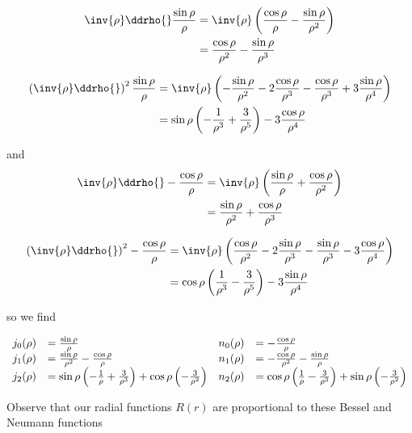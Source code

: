\begin{align*}
\inv{\rho} \ddrho{} \frac{\sin\rho}{\rho}
&= \inv{\rho} \left(
\frac{\cos\rho}{\rho}
-\frac{\sin\rho}{\rho^2}
\right) \\
&=
\frac{\cos\rho}{\rho^2}
-\frac{\sin\rho}{\rho^3}
\end{align*}

\begin{align*}
\left( \inv{\rho} \ddrho{} \right)^2 \frac{\sin\rho}{\rho}
&= \inv{\rho} \left(
-\frac{\sin\rho}{\rho^2}
-2\frac{\cos\rho}{\rho^3}
-\frac{\cos\rho}{\rho^3}
+3\frac{\sin\rho}{\rho^4}
\right) \\
&=
\sin\rho\left(
-\frac{1}{\rho^3}
+\frac{3}{\rho^5}
\right)
-3\frac{\cos\rho}{\rho^4}
\end{align*}

and
\begin{align*}
\inv{\rho} \ddrho{} -\frac{\cos\rho}{\rho}
&= \inv{\rho} \left(
\frac{\sin\rho}{\rho}
+\frac{\cos\rho}{\rho^2}
\right) \\
&=
\frac{\sin\rho}{\rho^2}
+\frac{\cos\rho}{\rho^3}
\end{align*}

\begin{align*}
\left( \inv{\rho} \ddrho{} \right)^2 -\frac{\cos\rho}{\rho}
&= \inv{\rho} \left(
\frac{\cos\rho}{\rho^2}
-2\frac{\sin\rho}{\rho^3}
-\frac{\sin\rho}{\rho^3}
-3\frac{\cos\rho}{\rho^4}
\right) \\
&=
\cos\rho\left(
\frac{1}{\rho^3}
-\frac{3}{\rho^5}
\right)
-3\frac{\sin\rho}{\rho^4}
\end{align*}

so we find

\begin{equation}\label{eqn:qmTwoL23:340}
\begin{array}{l l l l}
j_0(\rho) &= \frac{\sin\rho}{\rho} 					& n_0(\rho) &= -\frac{\cos\rho}{\rho} 	\\
j_1(\rho) &= \frac{\sin\rho}{\rho^2} -\frac{\cos\rho}{\rho} 		& n_1(\rho) &= -\frac{\cos\rho}{\rho^2} -\frac{\sin\rho}{\rho} \\
j_2(\rho) &= \sin\rho \left(-\frac{1}{\rho} + \frac{3}{\rho^3} \right) +\cos\rho \left(-\frac{3}{\rho^2} \right)
& n_2(\rho) &= \cos\rho \left(\frac{1}{\rho} - \frac{3}{\rho^3} \right) +\sin\rho \left(-\frac{3}{\rho^2} \right)
\end{array}
\end{equation}

Observe that our radial functions $R(r)$ are proportional to these Bessel and Neumann functions

